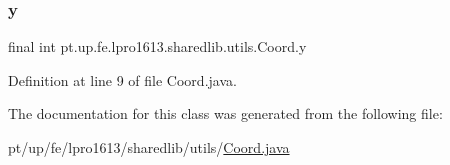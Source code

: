 \subsubsection{\texorpdfstring{y}{y}}
{\footnotesize\ttfamily final int pt.\+up.\+fe.\+lpro1613.\+sharedlib.\+utils.\+Coord.\+y}



Definition at line 9 of file Coord.\+java.



The documentation for this class was generated from the following file\+:\begin{DoxyCompactItemize}
\item 
pt/up/fe/lpro1613/sharedlib/utils/\hyperlink{_coord_8java}{Coord.\+java}\end{DoxyCompactItemize}
